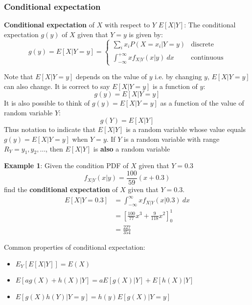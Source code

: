 \documentclass[10pt,a4paper]{article}
\begin{document}
\subsubsection{Conditional expectation}

\begin{tcolorbox}[breakable,colback=white]
\textbf{Conditional expectation} of $X$ with respect to $Y$ $E[X|Y]$: The conditional expectation $g(y)$ of $X$ given that $Y=y$ is given by:
$$
    g(y) = E[X|Y = y] = 
    \begin{cases}
        \sum_i x_i P(X=x_i | Y=y) & \text{discrete} \\
        \int_{-\infty}^{+\infty} x f_{X|Y}(x|y)\: dx & \text{continuous}
    \end{cases}
$$
\end{tcolorbox}

Note that $E[X|Y=y]$ depends on the value of $y$ i.e. by changing $y$, $E[X|Y=y]$ can also change.
It is correct to say $E[X|Y=y]$ is a function of $y$:
$$
    g(y) = E[X|Y = y]
$$
It is also possible to think of $g(y)=E[X|Y=y]$ as a function of the value of random variable $Y$:
$$
    g(Y)=E[X|Y]
$$
Thus notation to indicate that $E[X|Y]$ is a random variable whose value equals $g(y)=E[X|Y=y]$ when
$Y=y$. If $Y$ is a random variable with range $R_Y={y_1,y_2,\dots}$, then $E[X|Y]$ is \textbf{also} a random
variable 

\textbf{Example 1}: Given the condition PDF of $X$ given that $Y=0.3$
$$
    f_{X|Y}(x|y) = \frac{100}{59}(x+0.3)
$$
find the \textbf{conditional expectation} of $X$ given that $Y=0.3$.
\begin{align*}
    E[X|Y = 0.3] &= \int_{-\infty}^\infty xf_{X|Y}(x|0.3)\: dx \\
    &= \left[\frac{100}{77}x^3 + \frac{9}{118}x^2 \right]_0^1 \\
    &= \frac{227}{354}
\end{align*}

\begin{tcolorbox}[breakable,colback=white]
    Common properties of conditional expectation:
    \begin{itemize}
        \item $E_Y[E[X|Y]] = E(X)$
        \item $E[ag(X)+h(X)|Y] = aE[g(X)|Y]+E[h(X)|Y]$
        \item $E[g(X)h(Y)|Y=y]=h(y)E[g(X)|Y=y]$
    \end{itemize}
\end{tcolorbox}
\end{document}
